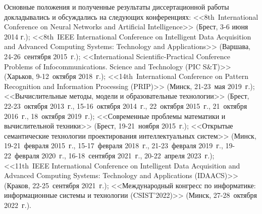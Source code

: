 Основные положения и полученные результаты диссертационной работы докладывались и обсуждались на следующих конференциях: <<8th~International Conference on Neural Networks and Artificial Intelligence>> (Брест, 3-6 июня 2014 г.); <<8th~IEEE International Conference on Intelligent Data Acquisition and Advanced Computing Systems: Technology and Applications>> (Варшава, 24-26~сентября 2015~г.); <<International Scientific-Practical Conference Problems of Infocommunications. Science and Technology (PIC S\&T)>> (Харьков, 9-12~октября 2018~г.); <<14th~International Conference on Pattern Recognition and Information Processing (PRIP)>> (Минск, 21-23~мая 2019~г.); <<Вычислительные методы, модели и образовательные технологии>> (Брест, 22-23~октября 2013~г., 15-16~октября 2014~г., 22~октября 2015~г., 21~октября 2016~г., 18~октября 2019~г.); <<Современные проблемы математики и вычислительной техники>> (Брест, 19-21~ноября 2015~г.); <<Открытые семантические технологии проектирования интеллектуальных систем>> (Минск, 19-21~февраля 2015~г., 15-17~февраля 2018~г., 21-23~февраля 2019~г., 19-22~февраля 2020~г., 16-18~сентября 2021~г., 20-22~апреля 2023~г.); <<11th~IEEE International Conference on Intelligent Data Acquisition and Advanced Computing Systems: Technology and Applications (IDAACS)>> (Краков, 22-25~сентября 2021~г.); <<Международный конгресс по информатике: информационные системы и технологии (CSIST'2022)>> (Минск, 27-28~октября 2022~г.).

